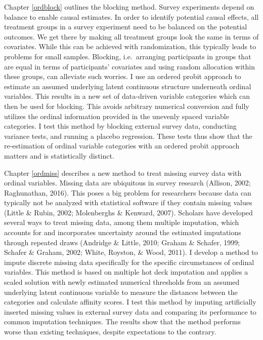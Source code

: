 \documentclass[12pt,econ]{sources/authesis}
\begin{document}
Chapter \ref{ordblock} outlines the blocking method. Survey experiments depend on balance to enable causal estimates. In order to identify potential causal effects, all treatment groups in a survey experiment need to be balanced on the potential outcomes. We get there by making all treatment groups look the same in terms of covariates. While this can be achieved with randomization, this typically leads to problems for small samples. Blocking, i.e.~arranging participants in groups that are equal in terms of participants' covariates and using random allocation within these groups, can alleviate such worries. I use an ordered probit approach to estimate an assumed underlying latent continuous structure underneath ordinal variables. This results in a new set of data-driven variable categories which can then be used for blocking. This avoids arbitrary numerical conversion and fully utilizes the ordinal information provided in the unevenly spaced variable categories. I test this method by blocking external survey data, conducting variance tests, and running a placebo regression. These tests thus show that the re-estimation of ordinal variable categories with an ordered probit approach matters and is statistically distinct.

Chapter \ref{ordmiss} describes a new method to treat missing survey data with ordinal variables. Missing data are ubiquitous in survey research (Allison, 2002; Raghunathan, 2016). This poses a big problem for researchers because data can typically not be analyzed with statistical software if they contain missing values (Little \& Rubin, 2002; Molenberghs \& Kenward, 2007). Scholars have developed several ways to treat missing data, among them multiple imputation, which accounts for and incorporates uncertainty around the estimated imputations through repeated draws (Andridge \& Little, 2010; Graham \& Schafer, 1999; Schafer \& Graham, 2002; White, Royston, \& Wood, 2011). I develop a method to impute discrete missing data specifically for the specific circumstances of ordinal variables. This method is based on multiple hot deck imputation and applies a scaled solution with newly estimated numerical thresholds from an assumed underlying latent continuous variable to measure the distances between the categories and calculate affinity scores. I test this method by imputing artificially inserted missing values in external survey data and comparing its performance to common imputation techniques. The results show that the method performs worse than existing techniques, despite expectations to the contrary.
\end{document}
